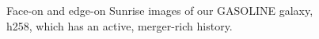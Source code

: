 \documentclass[manuscript]{aastex}
\begin{document}

\begin{figure}
\centerline{}
\caption[]{Face-on and edge-on Sunrise images of our GASOLINE galaxy, h258, which has an active, merger-rich history.}
\label{h258face} 
\end{figure}
\end{document}
